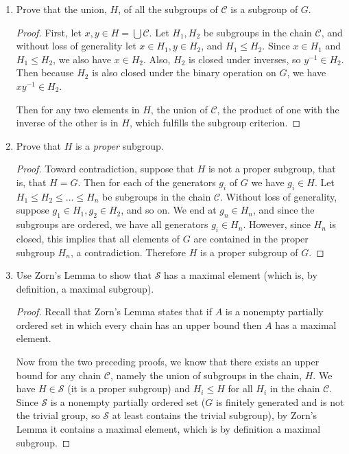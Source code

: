 \documentclass{article}
\begin{document}
\begin{enumerate}[label=(\alph*), itemsep=0em]
    \item Prove that the union, $H$, of all the subgroups of $\mathcal{C}$ is a subgroup of $G$.
          \begin{proof}
            First, let $x, y \in H = \bigcup \mathcal{C}$. Let $H_1, H_2$ be subgroups in the chain $\mathcal{C}$, and without loss of generality let $x \in H_1, y \in H_2$, and $H_1 \leq H_2$. Since $x \in H_1$ and $H_1 \leq H_2$, we also have $x \in H_2$. Also, $H_2$ is closed under inverses, so $y^{-1} \in H_2$. Then because $H_2$ is also closed under the binary operation on $G$, we have $xy^{-1} \in H_2$.

            Then for any two elements in $H$, the union of $\mathcal{C}$, the product of one with the inverse of the other is in $H$, which fulfills the subgroup criterion.
          \end{proof}
    \item Prove that $H$ is a \emph{proper} subgroup.
          \begin{proof}
            Toward contradiction, suppose that $H$ is not a proper subgroup, that is, that $H = G$. Then for each of the generators $g_i$ of $G$ we have $g_i \in H$. Let $H_1 \leq H_2 \leq ... \leq H_n$ be subgroups in the chain $\mathcal{C}$. Without loss of generality, suppose $g_1 \in H_1, g_2 \in H_2$, and so on. We end at $g_n \in H_n$, and since the subgroups are ordered, we have all generators $g_i \in H_n$. However, since $H_n$ is closed, this implies that all elements of $G$ are contained in the proper subgroup $H_n$, a contradiction. Therefore $H$ is a proper subgroup of $G$.
          \end{proof}
    \item Use Zorn's Lemma to show that $\mathcal{S}$ has a maximal element (which is, by definition, a maximal subgroup).
          \begin{proof}
            Recall that Zorn's Lemma states that if $A$ is a nonempty partially ordered set in which every chain has an upper bound then $A$ has a maximal element.

            Now from the two preceding proofs, we know that there exists an upper bound for any chain $\mathcal{C}$, namely the union of subgroups in the chain, $H$. We have $H \in \mathcal{S}$ (it is a proper subgroup) and $H_i \leq H$ for all $H_i$ in the chain $\mathcal{C}$. Since $\mathcal{S}$ is a nonempty partially ordered set ($G$ is finitely generated and is not the trivial group, so $\mathcal{S}$ at least contains the trivial subgroup), by Zorn's Lemma it contains a maximal element, which is by definition a maximal subgroup.
          \end{proof}
\end{enumerate}
\end{document}
